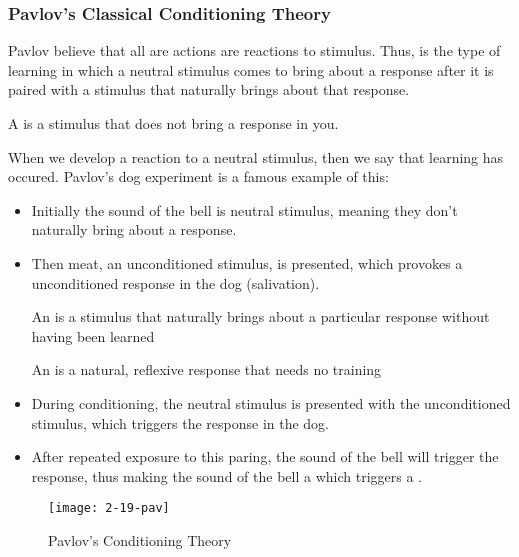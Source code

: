 \documentclass[../main/main.tex]{subfiles}
\begin{document}
\subsubsection{Pavlov's Classical Conditioning Theory}
Pavlov believe that all are actions are reactions to stimulus. Thus,  is the type of learning in which a neutral stimulus comes to bring about a response after it is paired with a stimulus that naturally brings about that response.
\begin{definition} 
A  is a stimulus that does not bring a response in you.
\end{definition}
When we develop a reaction to a neutral stimulus, then we say that learning has occured. Pavlov's dog experiment is a famous example of this:
\begin{itemize}
  \item Initially the sound of the bell is neutral stimulus, meaning they don't naturally bring about a response.
\item Then meat, an unconditioned stimulus, is presented, which provokes a unconditioned response in the dog (salivation).
        \begin{definition} 
An  is a stimulus that naturally brings about a particular response without having been learned
        \end{definition} 
        \begin{definition} An  is a natural, reflexive response that needs no training
        \end{definition}
        \item During conditioning, the neutral stimulus is presented with the unconditioned stimulus, which triggers the response in the dog.
        \item After repeated exposure to this paring, the sound of the bell will trigger the response, thus making the sound of the bell a  which triggers a .
\end{itemize}

\begin{figure}[htpb]
  \centering
  \texttt{[image: 2-19-pav]}
  \caption{Pavlov's Conditioning Theory}
  \label{2-19-pav}
\end{figure}
\end{document}
